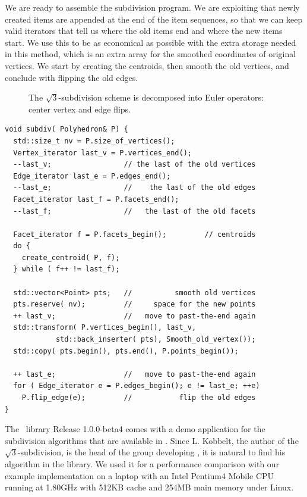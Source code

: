 We are ready to assemble the subdivision program. We are exploiting
that newly created items are appended at the end of the item
sequences, so that we can keep valid iterators that tell us where the
old items end and where the new items start. We use this to be as
economical as possible with the extra storage needed in this method,
which is an extra array for the smoothed coordinates of original
vertices. We start by creating the centroids, then smooth the old
vertices, and conclude with flipping the old edges.

\begin{figure}[tb]
    \caption{The $\sqrt{3}$-subdivision scheme is decomposed into
             Euler operators: center vertex and edge flips.}
    \label{fig:sqrt3_basic}
\end{figure}


\begin{lstlisting}
void subdiv( Polyhedron& P) {
  std::size_t nv = P.size_of_vertices();
  Vertex_iterator last_v = P.vertices_end();
  --last_v;                 // the last of the old vertices
  Edge_iterator last_e = P.edges_end();
  --last_e;                 //    the last of the old edges
  Facet_iterator last_f = P.facets_end();
  --last_f;                 //   the last of the old facets

  Facet_iterator f = P.facets_begin();         // centroids
  do {
    create_centroid( P, f);
  } while ( f++ != last_f);

  std::vector<Point> pts;   //          smooth old vertices
  pts.reserve( nv);         //     space for the new points
  ++ last_v;                //   move to past-the-end again
  std::transform( P.vertices_begin(), last_v, 
            std::back_inserter( pts), Smooth_old_vertex());
  std::copy( pts.begin(), pts.end(), P.points_begin());

  ++ last_e;                //   move to past-the-end again
  for ( Edge_iterator e = P.edges_begin(); e != last_e; ++e)
    P.flip_edge(e);         //           flip the old edges
}
\end{lstlisting}

The \openmesh\ library Release 1.0.0-beta4 comes with a demo
application for the subdivision algorithms that are available in
\openmesh. Since L.  Kobbelt, the author of the
$\sqrt{3}$-subdivision, is the head of the group developing \openmesh,
it is natural to find his algorithm in the library. We used it for a
performance comparison with our example implementation on a laptop
with an Intel Pentium4 Mobile CPU running at 1.80GHz with 512KB cache
and 254MB main memory under Linux.

